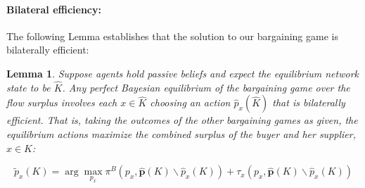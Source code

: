 \documentclass[12pt]{article} \usepackage{amsmath,amssymb,amsthm,geometry,graphicx,setspace,algorithm,algpseudocode,float}
\newtheorem{lemma}{Lemma}[section]
\newcommand{\subsubsubsection}[1]{\paragraph{#1}}
\begin{document}
\subsubsubsection{\textbf{Bilateral efficiency:}}
\label{sec:bilat_effic}
The following Lemma establishes that the solution to our bargaining game is bilaterally efficient:
\par
\medskip
\linespread{1.0} 
\begin{lemma} 
Suppose agents hold passive beliefs and expect the equilibrium network state
to be $\hat{K}$. Any perfect Bayesian equilibrium of the bargaining game
over the flow surplus involves each $x\in \hat{K}$ choosing an action $\hat{p
}_{x}(\hat{K})$ that is bilaterally efficient. That is, taking the outcomes
of the other bargaining games as given, the equilibrium actions maximize the
combined surplus of the buyer and her supplier, $x\in K$:

\begin{equation}
\tilde{p}_{x}(K) = 
\arg \max_{p_{x}}\pi ^{B}(p_{x},\mathbf{\hat{p}}(K)\backslash \hat{p}_{x}(K))+\tau
_{x}(p_{x},\mathbf{\hat{p}}(K)\backslash \hat{p}_{x}(K))  
\label{bilat_effic}
\end{equation}%
\label{lemma1}
\end{lemma}
\linespread{1.5} 
\end{document}
